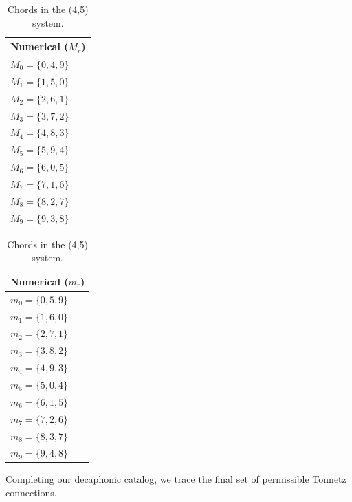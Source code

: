 \documentclass[11pt,letterpaper]{amsart}
\begin{document}
{\tiny \begin{table}[H]
    \centering
    \begin{minipage}{0.48\textwidth}
        \centering
        \begin{tabular}{l}
        \toprule
        \textbf{Numerical ($M_r$)} \\
        \midrule
        $M_0 = \{0, 4, 9\}$ \\
        $M_1 = \{1, 5, 0\}$ \\
        $M_2 = \{2, 6, 1\}$ \\
        $M_3 = \{3, 7, 2\}$ \\
        $M_4 = \{4, 8, 3\}$ \\
        $M_5 = \{5, 9, 4\}$ \\
        $M_6 = \{6, 0, 5\}$ \\
        $M_7 = \{7, 1, 6\}$ \\
        $M_8 = \{8, 2, 7\}$ \\
        $M_9 = \{9, 3, 8\}$ \\
        \bottomrule
        \end{tabular}
    \end{minipage}\hfill
    \begin{minipage}{0.48\textwidth}
        \centering
        \begin{tabular}{l}
        \toprule
        \textbf{Numerical ($m_r$)} \\
        \midrule
        $m_0 = \{0, 5, 9\}$ \\
        $m_1 = \{1, 6, 0\}$ \\
        $m_2 = \{2, 7, 1\}$ \\
        $m_3 = \{3, 8, 2\}$ \\
        $m_4 = \{4, 9, 3\}$ \\
        $m_5 = \{5, 0, 4\}$ \\
        $m_6 = \{6, 1, 5\}$ \\
        $m_7 = \{7, 2, 6\}$ \\
        $m_8 = \{8, 3, 7\}$ \\
        $m_9 = \{9, 4, 8\}$ \\
        \bottomrule
        \end{tabular}
    \end{minipage}
    \caption{Chords in the (4,5) system.}
\end{table}}

Completing our decaphonic catalog, we trace the final set of permissible Tonnetz connections. 
\end{document}
